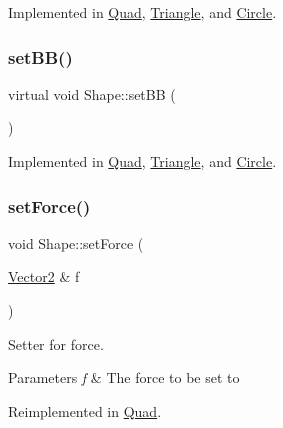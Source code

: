 Implemented in \mbox{\hyperlink{class_quad_abc8023f3883c6fe4391e24418a4258ab}{Quad}}, \mbox{\hyperlink{class_triangle_a46ec1698397a34b08cd788e305dda75c}{Triangle}}, and \mbox{\hyperlink{class_circle_a7236be8080b9ab07f5c26e34aa17c9ae}{Circle}}.

\mbox{\label{class_shape_a540779eb247ef00e4fb262f1f81e90d4}} 
\subsubsection{\texorpdfstring{setBB()}{setBB()}}
{\footnotesize\ttfamily virtual void Shape\+::set\+BB (\begin{DoxyParamCaption}{ }\end{DoxyParamCaption})\hspace{0.3cm}{\ttfamily [pure virtual]}}



Implemented in \mbox{\hyperlink{class_quad_a8707911fc752adad20b07a9a77f4ba0e}{Quad}}, \mbox{\hyperlink{class_triangle_a857d761fa1f0b53b355d46be53a4796e}{Triangle}}, and \mbox{\hyperlink{class_circle_ab33a020a2b85fbda10aa82c6e8c25327}{Circle}}.

\mbox{\label{class_shape_a76d8009348239dbf7426ae54f19844d2}} 
\subsubsection{\texorpdfstring{setForce()}{setForce()}}
{\footnotesize\ttfamily void Shape\+::set\+Force (\begin{DoxyParamCaption}\item[{\mbox{\hyperlink{struct_vector2}{Vector2}} \&}]{f }\end{DoxyParamCaption})\hspace{0.3cm}{\ttfamily [virtual]}}



Setter for force. 


\begin{DoxyParams}{Parameters}
{\em f} & The force to be set to \\
\hline
\end{DoxyParams}


Reimplemented in \mbox{\hyperlink{class_quad_a9adb3dc8ea14c8d1f5bf7492c5ba18f7}{Quad}}.

